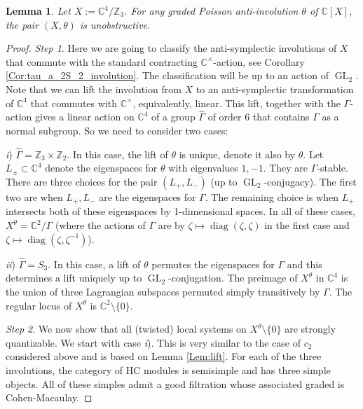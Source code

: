\documentclass[12pt]{amsart}
\newcommand{\C}{\mathbb{C}}
\newcommand{\Z}{\mathbb{Z}}
\newtheorem{Lem}[Thm]{Lemma}
\theoremstyle{definition}
\numberwithin{equation}{section}
\begin{document}
\begin{Lem}\label{Lem:tau_unobstructive}
Let $X:=\C^4/\mathbb{Z}_3$. For any graded Poisson anti-involution $\theta$ of $\C[X]$,
the pair $(X,\theta)$ is unobstructive.
\end{Lem}
\begin{proof}
{\it Step 1}.
Here we are going to classify the anti-symplectic involutions of $X$ that commute
with the standard contracting $\C^\times$-action, see Corollary \ref{Cor:tau_a_2S_2_involution}. The classification will be up to an action of $\operatorname{GL}_2$.
Note that we can lift the involution from $X$ to an anti-symplectic transformation of
$\C^4$ that commutes with $\C^\times$, equivalently, linear. This lift, together with
the $\Gamma$-action gives a linear action on $\C^4$ of a group $\hat{\Gamma}$ of order $6$ that contains
$\Gamma$ as a normal subgroup. So we need to consider two cases:

{\it i}) $\hat{\Gamma}=\Z_3\times \Z_2$. In this case, the lift of $\theta$ is unique, denote it also
by $\theta$. Let $L_\pm\subset \C^4$ denote the eigenspaces for $\theta$ with eigenvalues
$1,-1$. They are $\Gamma$-stable. There are three choices for the pair $(L_+,L_-)$
(up to $\operatorname{GL}_2$-conjugacy). The first two are when $L_+,L_-$ are the
eigenspaces for $\Gamma$. The remaining choice is when $L_+$ intersects both of these
eigenspaces by 1-dimensional spaces. In all of these cases, $X^\theta=\C^2/\Gamma$
(where the actions of $\Gamma$ are by $\zeta\mapsto \operatorname{diag}(\zeta,\zeta)$
in the first case and $\zeta\mapsto \operatorname{diag}(\zeta,\zeta^{-1})$).


{\it ii}) $\hat{\Gamma}=S_3$. In this case, a lift of $\theta$ permutes the eigenspaces for $\Gamma$
and this determines a lift uniquely up to $\operatorname{GL}_2$-conjugation. The preimage of
$X^\theta$ in $\C^4$ is the union of three Lagrangian subspaces permuted simply transitively
by $\Gamma$. The regular locus of $X^\theta$ is $\C^2\setminus \{0\}$.

{\it Step 2}. We now show that all (twisted) local systems on $X^\theta\setminus \{0\}$
are strongly quantizable.
We start with case {\it i}). This is very similar to the case of $c_2$ considered above
and is based on Lemma \ref{Lem:lift}.
For each of the three involutions, the category of HC modules is semisimple and has
three simple objects. All of these simples admit a good filtration whose associated graded
is Cohen-Macaulay.


\end{proof}
\end{document}
